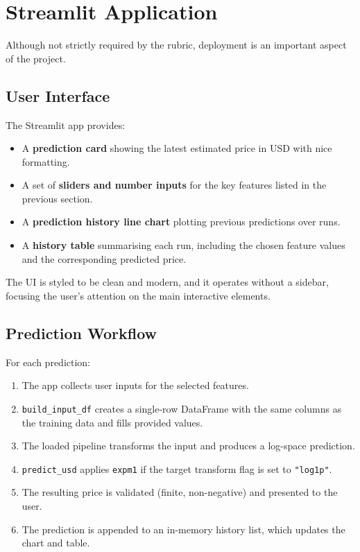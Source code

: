 \documentclass[11pt,a4paper]{article}
\begin{document}
\section{Streamlit Application}

Although not strictly required by the rubric, deployment is an important aspect of the project.

\subsection{User Interface}

The Streamlit app provides:

\begin{itemize}[leftmargin=*]
    \item A \textbf{prediction card} showing the latest estimated price in USD with nice formatting.
    \item A set of \textbf{sliders and number inputs} for the key features listed in the previous section.
    \item A \textbf{prediction history line chart} plotting previous predictions over runs.
    \item A \textbf{history table} summarising each run, including the chosen feature values and the corresponding predicted price.
\end{itemize}

The UI is styled to be clean and modern, and it operates without a sidebar, focusing the user’s attention on the main interactive elements.

\subsection{Prediction Workflow}

For each prediction:

\begin{enumerate}[leftmargin=*]
    \item The app collects user inputs for the selected features.
    \item \texttt{build\_input\_df} creates a single-row DataFrame with the same columns as the training data and fills provided values.
    \item The loaded pipeline transforms the input and produces a log-space prediction.
    \item \texttt{predict\_usd} applies \texttt{expm1} if the target transform flag is set to \texttt{"log1p"}.
    \item The resulting price is validated (finite, non-negative) and presented to the user.
    \item The prediction is appended to an in-memory history list, which updates the chart and table.
\end{enumerate}
\end{document}

